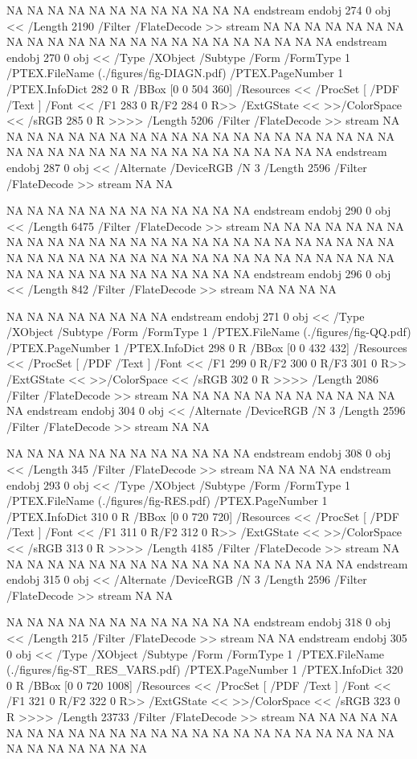 {NA
NA
NA
NA
NA
NA
NA
NA
NA
NA
NA
NA
endstream
endobj
274 0 obj <<
/Length 2190      
/Filter /FlateDecode
>>
stream
NA
NA
NA
NA
NA
NA
NA
NA
NA
NA
NA
NA
NA
NA
NA
NA
NA
NA
NA
NA
NA
NA
NA
endstream
endobj
270 0 obj <<
/Type /XObject
/Subtype /Form
/FormType 1
/PTEX.FileName (./figures/fig-DIAGN.pdf)
/PTEX.PageNumber 1
/PTEX.InfoDict 282 0 R
/BBox [0 0 504 360]
/Resources <<
/ProcSet [ /PDF /Text ]
/Font << /F1 283 0 R/F2 284 0 R>>
/ExtGState <<
>>/ColorSpace <<
/sRGB 285 0 R
>>>>
/Length 5206
/Filter /FlateDecode
>>
stream
NA
NA
NA
NA
NA
NA
NA
NA
NA
NA
NA
NA
NA
NA
NA
NA
NA
NA
NA
NA
NA
NA
NA
NA
NA
NA
NA
NA
NA
NA
NA
NA
NA
NA
NA
NA
endstream
endobj
287 0 obj
<<
/Alternate /DeviceRGB
/N 3
/Length 2596
/Filter /FlateDecode
>>
stream
NA
NA

NA
NA
NA
NA
NA
NA
NA
NA
NA
NA
NA
NA
endstream
endobj
290 0 obj <<
/Length 6475      
/Filter /FlateDecode
>>
stream
NA
NA
NA
NA
NA
NA
NA
NA
NA
NA
NA
NA
NA
NA
NA
NA
NA
NA
NA
NA
NA
NA
NA
NA
NA
NA
NA
NA
NA
NA
NA
NA
NA
NA
NA
NA
NA
NA
NA
NA
NA
NA
NA
NA
NA
NA
NA
NA
NA
NA
NA
NA
NA
NA
NA
NA
NA
endstream
endobj
296 0 obj <<
/Length 842       
/Filter /FlateDecode
>>
stream
NA
NA
NA
NA

NA
NA
NA
NA
NA
NA
NA
NA
endstream
endobj
271 0 obj <<
/Type /XObject
/Subtype /Form
/FormType 1
/PTEX.FileName (./figures/fig-QQ.pdf)
/PTEX.PageNumber 1
/PTEX.InfoDict 298 0 R
/BBox [0 0 432 432]
/Resources <<
/ProcSet [ /PDF /Text ]
/Font << /F1 299 0 R/F2 300 0 R/F3 301 0 R>>
/ExtGState <<
>>/ColorSpace <<
/sRGB 302 0 R
>>>>
/Length 2086
/Filter /FlateDecode
>>
stream
NA
NA
NA
NA
NA
NA
NA
NA
NA
NA
NA
NA
endstream
endobj
304 0 obj
<<
/Alternate /DeviceRGB
/N 3
/Length 2596
/Filter /FlateDecode
>>
stream
NA
NA

NA
NA
NA
NA
NA
NA
NA
NA
NA
NA
NA
NA
endstream
endobj
308 0 obj <<
/Length 345       
/Filter /FlateDecode
>>
stream
NA
NA
NA
NA
endstream
endobj
293 0 obj <<
/Type /XObject
/Subtype /Form
/FormType 1
/PTEX.FileName (./figures/fig-RES.pdf)
/PTEX.PageNumber 1
/PTEX.InfoDict 310 0 R
/BBox [0 0 720 720]
/Resources <<
/ProcSet [ /PDF /Text ]
/Font << /F1 311 0 R/F2 312 0 R>>
/ExtGState <<
>>/ColorSpace <<
/sRGB 313 0 R
>>>>
/Length 4185
/Filter /FlateDecode
>>
stream
NA
NA
NA
NA
NA
NA
NA
NA
NA
NA
NA
NA
NA
NA
NA
NA
NA
NA
endstream
endobj
315 0 obj
<<
/Alternate /DeviceRGB
/N 3
/Length 2596
/Filter /FlateDecode
>>
stream
NA
NA

NA
NA
NA
NA
NA
NA
NA
NA
NA
NA
NA
NA
endstream
endobj
318 0 obj <<
/Length 215       
/Filter /FlateDecode
>>
stream
NA
NA
endstream
endobj
305 0 obj <<
/Type /XObject
/Subtype /Form
/FormType 1
/PTEX.FileName (./figures/fig-ST_RES_VARS.pdf)
/PTEX.PageNumber 1
/PTEX.InfoDict 320 0 R
/BBox [0 0 720 1008]
/Resources <<
/ProcSet [ /PDF /Text ]
/Font << /F1 321 0 R/F2 322 0 R>>
/ExtGState <<
>>/ColorSpace <<
/sRGB 323 0 R
>>>>
/Length 23733
/Filter /FlateDecode
>>
stream
NA
NA
NA
NA
NA
NA
NA
NA
NA
NA
NA
NA
NA
NA
NA
NA
NA
NA
NA
NA
NA
NA
NA
NA
NA
NA
NA
NA
NA
NA
NA

}
